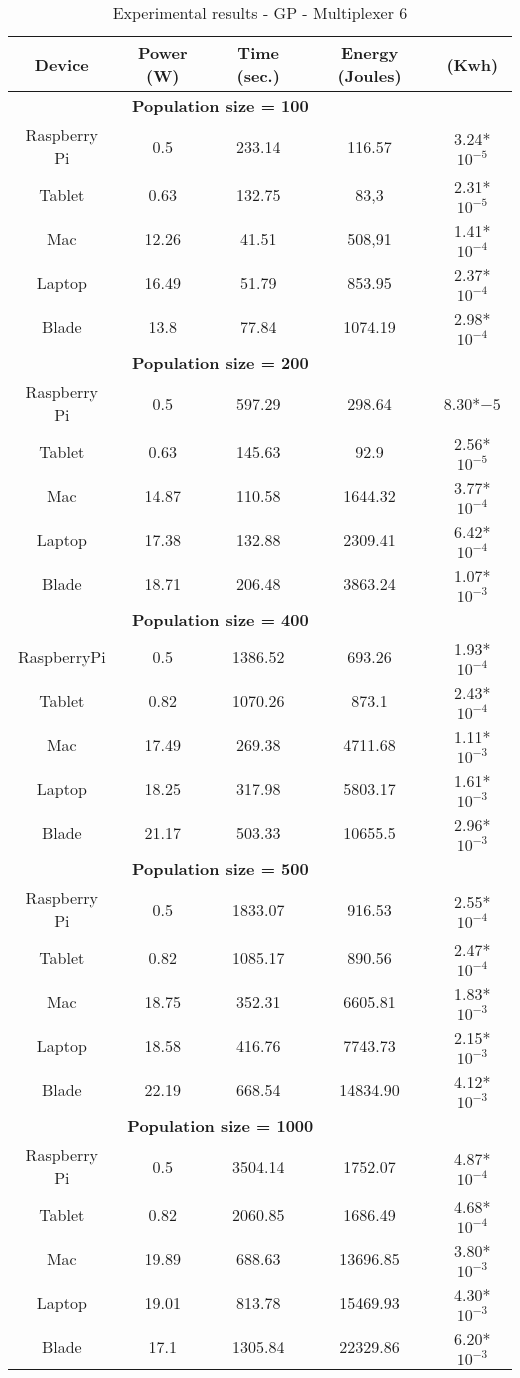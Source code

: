 \begin{small}

\begin{table}[!ht]
\renewcommand{\arraystretch}{1.3}
\centering
\caption{Experimental results - GP - Multiplexer 6}
\label{Table:result_todos}
\begin{tabular}{ccccc} \hline
Device & Power (W) & Time (sec.) & Energy (Joules) & (Kwh) \\ \hline
\multicolumn{4}{c}{\textbf{Population size = 100}}\\ %
Raspberry Pi & 0.5 & 233.14 &116.57 & 3.24*$10^{-5}$ \\
Tablet & 0.63 & 132.75 & 83,3&2.31*$10^{-5}$ \\
Mac & 12.26 & 41.51 & 508,91&1.41*$10^{-4}$ \\
Laptop & 16.49 & 51.79 & 853.95& 2.37*$10^{-4}$ \\
Blade & 13.8 & 77.84 & 1074.19&2.98*$10^{-4}$ \\ \hline
\multicolumn{4}{c}{\textbf{Population size = 200}}\\ %
Raspberry Pi &	0.5 &597.29 &298.64 & 8.30*${-5}$ \\
Tablet & 0.63 & 145.63 & 92.9&2.56*$10^{-5}$ \\
Mac & 14.87 & 110.58 & 1644.32&3.77*$10^{-4}$ \\
Laptop	& 17.38 & 132.88 & 2309.41&6.42*$10^{-4}$ \\
Blade & 18.71 & 206.48 & 3863.24&1.07*$10^{-3}$ \\ \hline
\multicolumn{4}{c}{\textbf{Population size = 400}}\\ %
 RaspberryPi&0.5&1386.52& 693.26&1.93*$10^{-4}$ \\
Tablet &0.82&1070.26& 873.1&2.43*$10^{-4}$\\
Mac&17.49&269.38&4711.68&1.11*$10^{-3}$\\
Laptop&18.25&317.98&5803.17 &1.61*$10^{-3}$\\
Blade&21.17&503.33&10655.5&2.96*$10^{-3}$ \\ \hline
\multicolumn{4}{c}{\textbf{Population size = 500}}\\ %
Raspberry Pi & 0.5&1833.07&916.53 &2.55*$10^{-4}$ \\
Tablet & 0.82 & 1085.17& 890.56&2.47*$10^{-4}$ \\
Mac & 18.75 & 352.31 & 6605.81&1.83*$10^{-3}$ \\
Laptop & 18.58 & 416.76 & 7743.73&2.15*$10^{-3}$ \\
Blade & 22.19 & 668.54 & 14834.90&4.12*$10^{-3}$ \\ \hline
\multicolumn{4}{c}{\textbf{Population size = 1000}}\\ %
Raspberry Pi&0.5&3504.14& 1752.07&4.87*$10^{-4}$ \\
Tablet & 0.82 & 2060.85 & 1686.49&4.68*$10^{-4}$ \\
Mac &19.89 & 688.63 & 13696.85&3.80*$10^{-3}$ \\
Laptop &19.01&813.78& 15469.93&4.30*$10^{-3}$ \\
Blade &	17.1&1305.84& 22329.86&6.20*$10^{-3}$ \\ \hline


\end{tabular}
\end{table}
\end{small}
